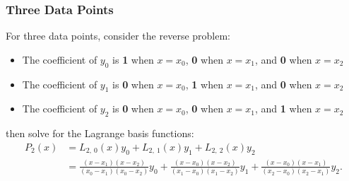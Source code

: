\documentclass{article}
\begin{document}
\subsubsection{Three Data Points}
For three data points, consider the reverse problem:
\begin{itemize}
    \item The coefficient of \(y_0\) is \textbf{1} when \(x = x_0\),
          \textbf{0} when \(x = x_1\), and \textbf{0} when \(x = x_2\)
    \item The coefficient of \(y_1\) is \textbf{0} when \(x = x_0\),
          \textbf{1} when \(x = x_1\), and \textbf{0} when \(x = x_2\)
    \item The coefficient of \(y_2\) is \textbf{0} when \(x = x_0\),
          \textbf{0} when \(x = x_1\), and \textbf{1} when \(x = x_2\)
\end{itemize}
then solve for the Lagrange basis functions:
\begin{align*}
    P_2\left( x \right) & = L_{2,\: 0}\left( x \right) y_0 + L_{2,\: 1}\left( x \right) y_1 + L_{2,\: 2}\left( x \right) y_2                                                                                                                                                                                                                                   \\
                        & = \frac{\left( x - x_1 \right)\left( x - x_2 \right)}{\left( x_0 - x_1 \right)\left( x_0 - x_2 \right)} y_0 + \frac{\left( x - x_0 \right)\left( x - x_2 \right)}{\left( x_1 - x_0 \right)\left( x_1 - x_2 \right)} y_1 + \frac{\left( x - x_0 \right)\left( x - x_1 \right)}{\left( x_2 - x_0 \right)\left( x_2 - x_1 \right)} y_2.
\end{align*}
\end{document}
